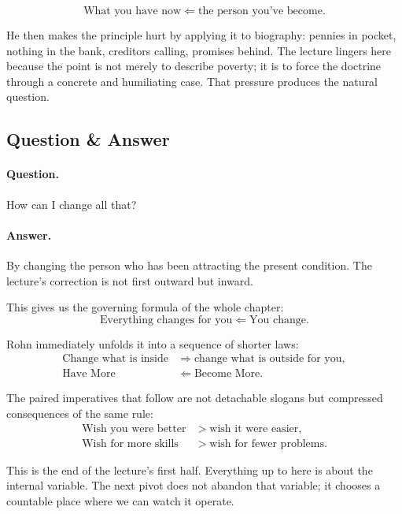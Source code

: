 \begin{equation}
\text{What you have now} \Longleftarrow \text{the person you've become}.
\end{equation}

He then makes the principle hurt by applying it to biography: pennies in pocket, nothing in the bank, creditors calling, promises behind. The lecture lingers here because the point is not merely to describe poverty; it is to force the doctrine through a concrete and humiliating case. That pressure produces the natural question.

\subsection{Question \& Answer}

\paragraph{Question.} How can I change all that?

\paragraph{Answer.} By changing the person who has been attracting the present condition. The lecture's correction is not first outward but inward.

This gives us the governing formula of the whole chapter:
\begin{equation}
\text{Everything changes for you} \Longleftarrow \text{You change}.
\end{equation}

Rohn immediately unfolds it into a sequence of shorter laws:
\begin{align}
\text{Change what is inside} &\Longrightarrow \text{change what is outside for you},\\
\text{Have More} &\Longleftarrow \text{Become More}.
\end{align}

The paired imperatives that follow are not detachable slogans but compressed consequences of the same rule:
\begin{align}
\text{Wish you were better} &> \text{wish it were easier},\\
\text{Wish for more skills} &> \text{wish for fewer problems}.
\end{align}

This is the end of the lecture's first half. Everything up to here is about the internal variable. The next pivot does not abandon that variable; it chooses a countable place where we can watch it operate.

